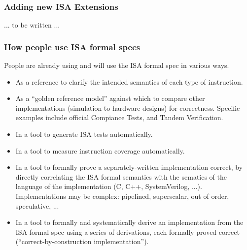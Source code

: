 \documentclass[aspectratio=169]{beamer}
\newcommand{\slidefont}{\scriptsize}
\begin{document}

\begin{frame}[fragile]
  \frametitle{Adding new ISA Extensions}

  ... to be written ...
\end{frame}


\begin{frame}[fragile]
  \frametitle{How people use ISA formal specs}

  \slidefont

  People are already using and will use the ISA formal spec in various ways.

  \begin{itemize}
    \item As a reference to clarify the intended semantics of each type of instruction.

    \item As a ``golden reference model'' against which to compare
      other implementations (simulation to hardware designs) for
      correctness.  Specific examples include official Compiance
      Tests, and Tandem Verification.

    \item In a tool to generate ISA tests automatically.

    \item In a tool to measure instruction coverage automatically.

    \item In a tool to formally prove a separately-written
      implementation correct, by directly correlating the ISA formal
      semantics with the sematics of the language of the
      implementation (C, C++, SystemVerilog, ...).  Implementations
      may be complex: pipelined, superscalar, out of order,
      speculative, ...

    \item In a tool to formally and systematically derive an
      implementation from the ISA formal spec using a series of
      derivations, each formally proved correct
      (``correct-by-construction implementation'').

  \end{itemize}

\end{frame}

\end{document}
